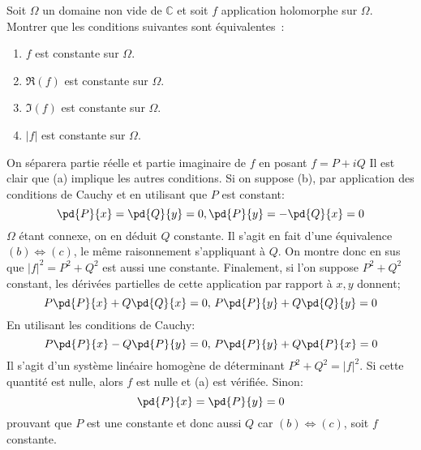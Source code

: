\begin{fex}
 Soit $\Omega$ un domaine non vide de $\mathbb{C}$ et soit $f$ application
holomorphe sur $\Omega$. Montrer que les conditions suivantes sont
équivalentes~:
\renewcommand{\theenumi}{\alph{enumi}}
\begin{enumerate}
\item $f$ est constante sur $\Omega$.
\item $\Re(f)$ est constante sur $\Omega$.
\item $\Im(f)$ est constante sur $\Omega$.
\item $|f|$ est constante sur $\Omega$.
\end{enumerate}
\end{fex}
On séparera partie réelle et partie imaginaire de $f$ en posant $f=P+iQ$
Il est clair que (a) implique les autres conditions. Si on suppose (b), par
application des conditions de Cauchy et en utilisant que $P$ est constant:
\[
 \pd{P}{x} = \pd{Q}{y} = 0 , \pd{P}{y}=-\pd{Q}{x} = 0
\]
$\Omega$ étant connexe, on en déduit $Q$ constante. Il s'agit en fait d'une
équivalence $(b) \Leftrightarrow (c)$, le même raisonnement s'appliquant à $Q$.
On montre donc en sus que $|f|^2=P^2+Q^2$ est aussi une constante.
Finalement, si l'on suppose $P^2+Q^2$ constant, les dérivées partielles de
cette application par rapport à $x,y$ donnent;
\[
 P\pd{P}{x}+Q\pd{Q}{x}= 0,\,  P\pd{P}{y}+Q\pd{Q}{y}= 0
\]
En utilisant les conditions de Cauchy:
\[
 P\pd{P}{x}-Q\pd{P}{y}= 0,\,  P\pd{P}{y}+Q\pd{P}{x}= 0
\]
Il s'agit d'un système linéaire homogène de déterminant $P^2+Q^2=|f|^2$. Si
cette quantité est nulle, alors $f$ est nulle et (a) est vérifiée. Sinon:
\[
 \pd{P}{x}=\pd{P}{y}=0
\]
prouvant que $P$ est une constante et donc aussi $Q$ car $(b) \Leftrightarrow
(c)$, soit $f$ constante.

